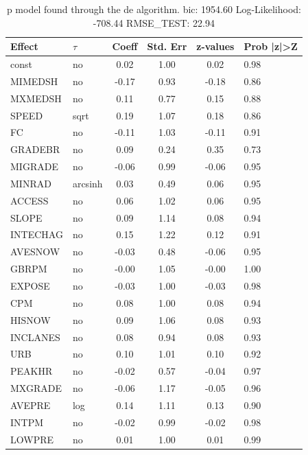 \begin{table}
	\caption{p model found through the de algorithm. bic: 1954.60 Log-Likelihood: -708.44 RMSE_TEST: 22.94}
	\begin{center}
		\begin{tabular}{|l|l|c|c|c|l|}
			\hline
			Effect & $\tau$ & Coeff & Std. Err & z-values & Prob |z|>Z \\
			\hline
			const & no & 0.02 & 1.00 & 0.02 & 0.98 \\
			\hline
			MIMEDSH & no & -0.17 & 0.93 & -0.18 & 0.86 \\
			\hline
			MXMEDSH & no & 0.11 & 0.77 & 0.15 & 0.88 \\
			\hline
			SPEED & sqrt & 0.19 & 1.07 & 0.18 & 0.86 \\
			\hline
			FC & no & -0.11 & 1.03 & -0.11 & 0.91 \\
			\hline
			GRADEBR & no & 0.09 & 0.24 & 0.35 & 0.73 \\
			\hline
			MIGRADE & no & -0.06 & 0.99 & -0.06 & 0.95 \\
			\hline
			MINRAD & arcsinh & 0.03 & 0.49 & 0.06 & 0.95 \\
			\hline
			ACCESS & no & 0.06 & 1.02 & 0.06 & 0.95 \\
			\hline
			SLOPE & no & 0.09 & 1.14 & 0.08 & 0.94 \\
			\hline
			INTECHAG & no & 0.15 & 1.22 & 0.12 & 0.91 \\
			\hline
			AVESNOW & no & -0.03 & 0.48 & -0.06 & 0.95 \\
			\hline
			GBRPM & no & -0.00 & 1.05 & -0.00 & 1.00 \\
			\hline
			EXPOSE & no & -0.03 & 1.00 & -0.03 & 0.98 \\
			\hline
			CPM & no & 0.08 & 1.00 & 0.08 & 0.94 \\
			\hline
			HISNOW & no & 0.09 & 1.06 & 0.08 & 0.93 \\
			\hline
			INCLANES & no & 0.08 & 0.94 & 0.08 & 0.93 \\
			\hline
			URB & no & 0.10 & 1.01 & 0.10 & 0.92 \\
			\hline
			PEAKHR & no & -0.02 & 0.57 & -0.04 & 0.97 \\
			\hline
			MXGRADE & no & -0.06 & 1.17 & -0.05 & 0.96 \\
			\hline
			AVEPRE & log & 0.14 & 1.11 & 0.13 & 0.90 \\
			\hline
			INTPM & no & -0.02 & 0.99 & -0.02 & 0.98 \\
			\hline
			LOWPRE & no & 0.01 & 1.00 & 0.01 & 0.99 \\

\end{tabular}
\end{center}
\end{table}
